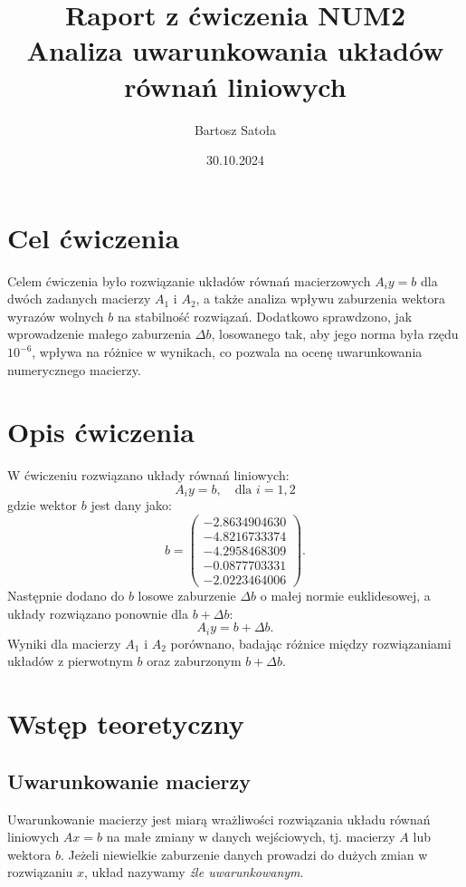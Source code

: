 \documentclass[a4paper, 12pt]{article}
\title{Raport z ćwiczenia NUM2\\Analiza uwarunkowania układów równań liniowych}
\author{Bartosz Satoła}
\date{30.10.2024}
\begin{document}
\maketitle
\tableofcontents
\newpage

\section{Cel ćwiczenia}
Celem ćwiczenia było rozwiązanie układów równań macierzowych \( A_i y = b \) dla dwóch zadanych macierzy \( A_1 \) i \( A_2 \), a także analiza wpływu zaburzenia wektora wyrazów wolnych \( b \) na stabilność rozwiązań. Dodatkowo sprawdzono, jak wprowadzenie małego zaburzenia \( \Delta b \), losowanego tak, aby jego norma była rzędu \( 10^{-6} \), wpływa na różnice w wynikach, co pozwala na ocenę uwarunkowania numerycznego macierzy.

\section{Opis ćwiczenia}
W ćwiczeniu rozwiązano układy równań liniowych:
\[
A_i y = b, \quad \text{dla } i = 1, 2
\]
gdzie wektor \( b \) jest dany jako:
\[
b = \begin{pmatrix} -2.8634904630 \\ -4.8216733374 \\ -4.2958468309 \\ -0.0877703331 \\ -2.0223464006 \end{pmatrix}.
\]
Następnie dodano do \( b \) losowe zaburzenie \( \Delta b \) o małej normie euklidesowej, a układy rozwiązano ponownie dla \( b + \Delta b \):
\[
A_i y = b + \Delta b.
\]
Wyniki dla macierzy \( A_1 \) i \( A_2 \) porównano, badając różnice między rozwiązaniami układów z pierwotnym \( b \) oraz zaburzonym \( b + \Delta b \).

\section{Wstęp teoretyczny}
\subsection{Uwarunkowanie macierzy}
Uwarunkowanie macierzy jest miarą wrażliwości rozwiązania układu równań liniowych \( Ax = b \) na małe zmiany w danych wejściowych, tj. macierzy \( A \) lub wektora \( b \). Jeżeli niewielkie zaburzenie danych prowadzi do dużych zmian w rozwiązaniu \( x \), układ nazywamy \textit{źle uwarunkowanym}. 
\end{document}
